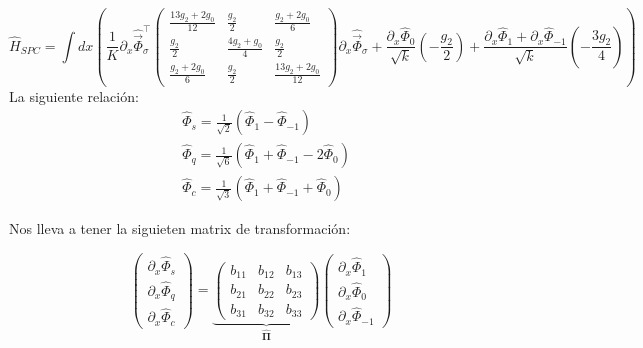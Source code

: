 \begin{equation} %
    \hat{H}_{SPC} = \int dx \left( \frac{1}{K} \partial_{x}\hat{\vec{\Phi}}_{\sigma}^\top
                    \begin{pmatrix}
                    \frac{13 g_2 + 2 g_0}{12} & \frac{g_2}{2} & \frac{g_2+2g_0}{6} \\
                    \frac{g_2}{2} & \frac{4g_2 +  g_0}{4} & \frac{g_2}{2} \\
                    \frac{g_2+2g_0}{6}& \frac{g_2}{2}& \frac{13 g_2 + 2 g_0}{12} 
            \end{pmatrix}  \partial_{x}\hat{\vec{\Phi}}_\sigma  + \frac{\partial_{x} \hat{\Phi}_{0}}{\sqrt{k}} \left( -\frac{g_{2}}{2} \right) + \frac{\partial_{x} \hat{\Phi}_{1}+ \partial_{x} \hat{\Phi}_{-1}}{\sqrt{k}} \left( -\frac{3g_{2}}{4} \right) \right) 
\end{equation}
\newpage
La siguiente relación:
\begin{align*}
& \hat{\Phi}_{s}=\frac{1}{\sqrt{2}}\left(\hat{\Phi}_{1}-\hat{\Phi}_{-1}\right) \\
& \hat{\Phi}_{q}=\frac{1}{\sqrt{6}}\left(\hat{\Phi}_{1}+\hat{\Phi}_{-1}-2 \hat{\Phi}_{0}\right)  \\
& \hat{\Phi}_{c}=\frac{1}{\sqrt{3}}\left(\hat{\Phi}_{1}+\hat{\Phi}_{-1}+\hat{\Phi}_{0}\right)
\end{align*}

Nos lleva a tener la siguieten matrix de transformación:


\begin{equation}
    \begin{pmatrix}
\partial_{x} \hat{\Phi}_{s} \\
\partial_{x} \hat{\Phi}_{q} \\
\partial_{x} \hat{\Phi}_{c}
\end{pmatrix} = \underbrace{\begin{pmatrix}
b_{11} & b_{12} & b_{13} \\
b_{21} & b_{22} & b_{23} \\
b_{31} & b_{32} & b_{33}
\end{pmatrix}}_{\mathbf{\hat{\Pi}}}   \begin{pmatrix}
\partial_{x} \hat{\Phi}_{1} \\
\partial_{x} \hat{\Phi}_{0} \\
\partial_{x} \hat{\Phi}_{-1}
\end{pmatrix}
\end{equation}

